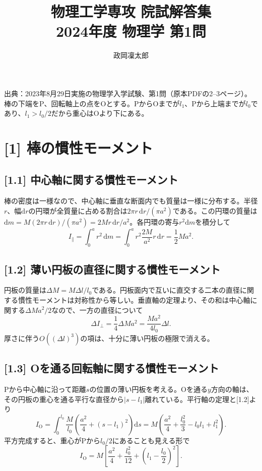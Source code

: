 \documentclass[11pt,a4paper]{article}
\title{物理工学専攻 院試解答集\\2024年度 物理学 第1問}
\author{政岡凜太郎}
\date{}
\begin{document}
\maketitle

\noindent 出典：2023年8月29日実施の物理学入学試験、第1問（原本PDFの2--3ページ）。棒の下端をP、回転軸上の点をOとする。PからOまでが$l_1$、Pから上端までが$l_0$であり、$l_1>l_0/2$だから重心はOより下にある。

\section*{[1] 棒の慣性モーメント}

\subsection*{[1.1] 中心軸に関する慣性モーメント}
棒の密度は一様なので、中心軸に垂直な断面内でも質量は一様に分布する。半径$r$、幅$\mathrm{d}r$の円環が全質量に占める割合は$2\pi r\,\mathrm{d}r/(\pi a^2)$である。この円環の質量は$\mathrm{d}m=M(2\pi r\,\mathrm{d}r)/(\pi a^2)=2Mr\,\mathrm{d}r/a^2$。各円環の寄与$r^2\mathrm{d}m$を積分して
\[
 I_{\parallel}=\int_0^a r^2\,\mathrm{d}m
 =\int_0^a r^2\frac{2M}{a^2}r\,\mathrm{d}r
 =\boxed{\frac12 Ma^2}.
\]

\subsection*{[1.2] 薄い円板の直径に関する慣性モーメント}
円板の質量は$\Delta M=M\Delta l/l_0$である。円板面内で互いに直交する二本の直径に関する慣性モーメントは対称性から等しい。垂直軸の定理より、その和は中心軸に関する$\Delta M a^2/2$なので、一方の直径について
\[
 \boxed{\Delta I_{\perp}=\frac14\Delta M a^2
 =\frac{Ma^2}{4l_0}\Delta l}.
\]
厚さに伴う$O((\Delta l)^3)$の項は、十分に薄い円板の極限で消える。

\subsection*{[1.3] Oを通る回転軸に関する慣性モーメント}
Pから中心軸に沿って距離$s$の位置の薄い円板を考える。Oを通る$y$方向の軸は、その円板の重心を通る平行な直径から$|s-l_1|$離れている。平行軸の定理と[1.2]より
\[
 I_{\mathrm O}=\int_0^{l_0}\frac{M}{l_0}
 \left(\frac{a^2}{4}+(s-l_1)^2\right)\mathrm{d}s
 =M\left(\frac{a^2}{4}+\frac{l_0^2}{3}-l_0l_1+l_1^2\right).
\]
平方完成すると、重心がPから$l_0/2$にあることも見える形で
\[
 \boxed{I_{\mathrm O}=M\left[\frac{a^2}{4}+\frac{l_0^2}{12}
 +\left(l_1-\frac{l_0}{2}\right)^2\right]}.
\]
\end{document}
